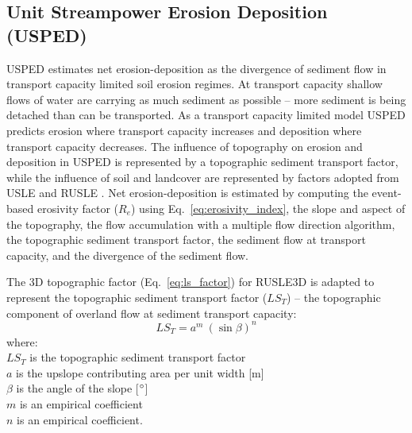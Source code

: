 \documentclass[gmd, manuscript]{copernicus}
\begin{document}
\subsection{Unit Streampower Erosion Deposition (USPED)} \label{usped_model}
USPED estimates net erosion-deposition as the divergence of sediment flow
in transport capacity limited soil erosion regimes.
At transport capacity 
shallow flows of water are carrying as much sediment as possible 
-- more sediment is being detached 
than can be transported.
As a transport capacity limited model
USPED predicts erosion where transport capacity increases
and deposition where transport capacity decreases. 
The influence of topography on erosion and deposition in USPED 
is represented by a topographic sediment transport factor,
while the influence of soil and landcover are represented by 
factors adopted from USLE and RUSLE
\citep{Mitasova1996}.
%
Net erosion-deposition is estimated by computing
the event-based erosivity factor ($R_e$) 
using Eq.~\ref{eq:erosivity_index},
the slope and aspect of the topography,
the flow accumulation with a multiple flow direction algorithm,
the topographic sediment transport factor,
the sediment flow at transport capacity,
and the divergence of the sediment flow. 

The 3D topographic factor (Eq.~\ref{eq:ls_factor}) 
for RUSLE3D is adapted to represent 
the topographic sediment transport factor ($LS_T$) --
the topographic component 
of overland flow at sediment transport capacity:
%
\begin{equation}
\label{eq:lst_factor}
{LS_T = a^{m} ~ (\sin \beta)^{n}}
\end{equation}
%
{\small
\noindent
where: \\
\noindent
\hspace*{0.5em} $LS_T$ is the topographic sediment transport factor\\
\hspace*{0.5em} $a$ is the upslope contributing area per unit width [m]\\
\hspace*{0.5em} $\beta$ is the angle of the slope [$^{\circ}$]\\
\hspace*{0.5em} $m$ is an empirical coefficient\\
\hspace*{0.5em} $n$ is an empirical coefficient.\\
}
\end{document}
